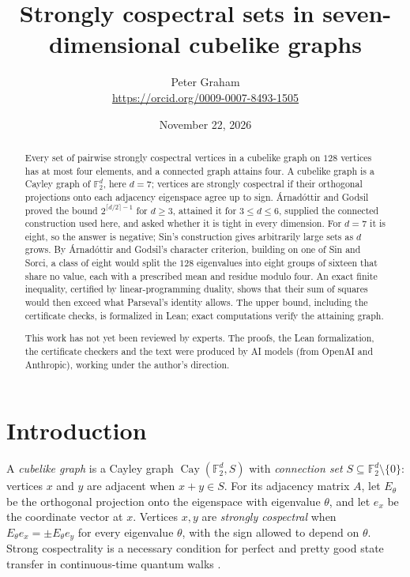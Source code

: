 \documentclass[11pt]{article}
\author{Peter Graham\\ \small\url{https://orcid.org/0009-0007-8493-1505}}
\date{November 22, 2026}
\theoremstyle{definition}
\newcommand{\F}{\mathbb F}
\newcommand{\Cay}{\operatorname{Cay}}
\begin{document}
\title{Strongly cospectral sets in seven-dimensional cubelike graphs}
\maketitle
\begin{abstract}
Every set of pairwise strongly cospectral vertices in a cubelike graph
on $128$ vertices has at most four elements, and a connected graph
attains four. A cubelike graph is a Cayley graph of $\mathbb{F}_2^d$,
here $d=7$; vertices are strongly cospectral if their orthogonal
projections onto each adjacency eigenspace agree up to sign.
\'Arnad\'ottir and Godsil proved the bound $2^{\lceil d/2\rceil-1}$ for
$d\geq3$, attained it for $3\leq d\leq6$, supplied the connected
construction used here, and asked whether it is tight in every
dimension. For $d=7$ it is eight, so the answer is negative; Sin's
construction gives arbitrarily large sets as $d$ grows. By
\'Arnad\'ottir and Godsil's character criterion, building on one of Sin
and Sorci, a class of eight would split the $128$ eigenvalues into eight
groups of sixteen that share no value, each with a prescribed mean and
residue modulo four. An exact finite inequality, certified by
linear-programming duality, shows that their sum of squares would then
exceed what Parseval's identity allows. The upper bound, including the
certificate checks, is formalized in Lean; exact computations verify the
attaining graph.

This work has not yet been reviewed by experts. The proofs, the Lean formalization, the certificate checkers and the text were produced by AI models (from OpenAI and Anthropic), working under the author's direction.
\end{abstract}
\medskip

\section{Introduction}
A \emph{cubelike graph} is a Cayley graph $\Cay(\F_2^d,S)$ with
\emph{connection set} $S\subseteq\F_2^d\setminus\{0\}$: vertices $x$ and $y$ are adjacent when
$x+y\in S$. For its adjacency matrix $A$, let $E_\theta$ be the orthogonal
projection onto the eigenspace with eigenvalue $\theta$, and let $e_x$ be
the coordinate vector at $x$. Vertices $x,y$ are \emph{strongly cospectral}
when $E_\theta e_x=\pm E_\theta e_y$ for every eigenvalue $\theta$, with
the sign allowed to depend on $\theta$. Strong cospectrality is a
necessary condition for perfect and pretty good state transfer in
continuous-time quantum walks \cite{GodsilStateTransfer,GodsilSmith}.
\end{document}
